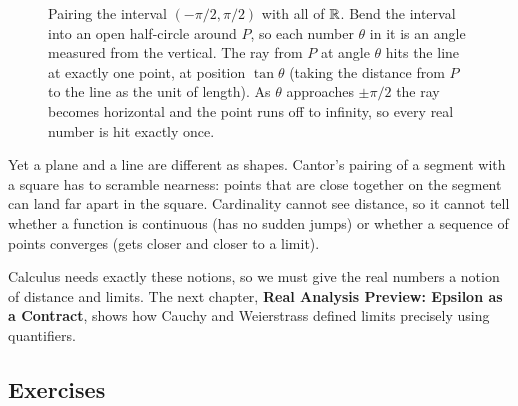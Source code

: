 \begin{figure}[htbp]
\caption{Pairing the interval $(-\pi/2, \pi/2)$ with all of $\mathbb{R}$. Bend the interval into an open half-circle around $P$, so each number $\theta$ in it is an angle measured from the vertical. The ray from $P$ at angle $\theta$ hits the line at exactly one point, at position $\tan\theta$ (taking the distance from $P$ to the line as the unit of length). As $\theta$ approaches $\pm\pi/2$ the ray becomes horizontal and the point runs off to infinity, so every real number is hit exactly once.}
\label{19:fig-interval-to-real-line}
\end{figure}

Yet a plane and a line are different as shapes. Cantor's pairing of a segment with a square has to scramble nearness: points that are close together on the segment can land far apart in the square. Cardinality cannot see distance, so it cannot tell whether a function is continuous (has no sudden jumps) or whether a sequence of points converges (gets closer and closer to a limit).

Calculus needs exactly these notions, so we must give the real numbers a notion of distance and limits. The next chapter, \textbf{Real Analysis Preview: Epsilon as a Contract}, shows how Cauchy and Weierstrass defined limits precisely using quantifiers.

\subsection{Exercises}


